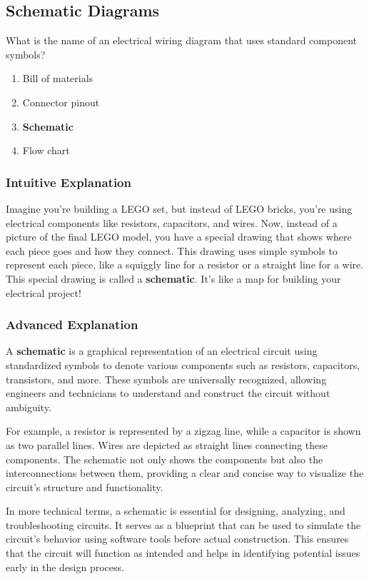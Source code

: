 \subsection{Schematic Diagrams}
\label{T6C01}

\begin{tcolorbox}[colback=gray!10!white,colframe=black!75!black,title=T6C01]
What is the name of an electrical wiring diagram that uses standard component symbols?
\begin{enumerate}[label=\Alph*)]
    \item Bill of materials
    \item Connector pinout
    \item \textbf{Schematic}
    \item Flow chart
\end{enumerate}
\end{tcolorbox}

\subsubsection{Intuitive Explanation}
Imagine you’re building a LEGO set, but instead of LEGO bricks, you’re using electrical components like resistors, capacitors, and wires. Now, instead of a picture of the final LEGO model, you have a special drawing that shows where each piece goes and how they connect. This drawing uses simple symbols to represent each piece, like a squiggly line for a resistor or a straight line for a wire. This special drawing is called a \textbf{schematic}. It’s like a map for building your electrical project!

\subsubsection{Advanced Explanation}
A \textbf{schematic} is a graphical representation of an electrical circuit using standardized symbols to denote various components such as resistors, capacitors, transistors, and more. These symbols are universally recognized, allowing engineers and technicians to understand and construct the circuit without ambiguity. 

For example, a resistor is represented by a zigzag line, while a capacitor is shown as two parallel lines. Wires are depicted as straight lines connecting these components. The schematic not only shows the components but also the interconnections between them, providing a clear and concise way to visualize the circuit's structure and functionality.

In more technical terms, a schematic is essential for designing, analyzing, and troubleshooting circuits. It serves as a blueprint that can be used to simulate the circuit's behavior using software tools before actual construction. This ensures that the circuit will function as intended and helps in identifying potential issues early in the design process.

